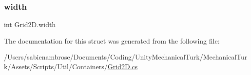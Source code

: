 \mbox{\label{struct_grid2_d_abe3dc5ac69835aa5f571338fbb6b5d8e}} 
\subsubsection{\texorpdfstring{width}{width}}
{\footnotesize\ttfamily int Grid2\+D.\+width}



The documentation for this struct was generated from the following file\+:\begin{DoxyCompactItemize}
\item 
/\+Users/sabienambrose/\+Documents/\+Coding/\+Unity\+Mechanical\+Turk/\+Mechanical\+Turk/\+Assets/\+Scripts/\+Util/\+Containers/\mbox{\hyperlink{_grid2_d_8cs}{Grid2\+D.\+cs}}\end{DoxyCompactItemize}

